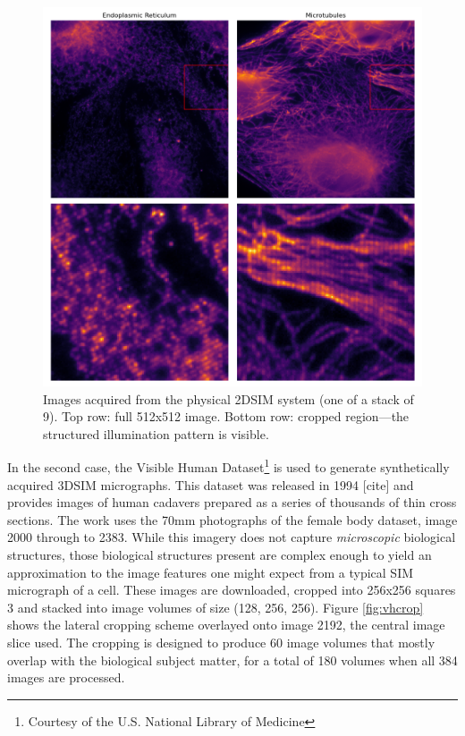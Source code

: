 \documentclass[12pt]{article}
\begin{document}
\begin{figure}[hbtp]
    \includegraphics[scale=0.53, center]{figures/2DSIM.png}
    \caption{Images acquired from the physical 2DSIM system (one of a stack of 9).
    Top row: full 512x512 image. Bottom row: cropped region---the structured illumination pattern is visible.}
    \label{fig:2DSIM}
\end{figure}

In the second case, the Visible Human Dataset\footnote{Courtesy of the U.S. National Library of Medicine} is used to generate synthetically acquired 3DSIM micrographs.
This dataset was released in 1994 [cite] and provides images of human cadavers prepared as a series of thousands of thin cross sections.
The work uses the 70mm photographs of the female body dataset, image 2000 through to 2383.
While this imagery does not capture \textit{microscopic} biological structures,
those biological structures present are complex enough to yield an approximation to the image features one might expect from a typical SIM micrograph of a cell.
These images are downloaded, cropped into 256x256 squares 3 and stacked into image volumes of size (128, 256, 256).
Figure \ref{fig:vhcrop} shows the lateral cropping scheme overlayed onto image 2192,
the central image slice used.
The cropping is designed to produce 60 image volumes that mostly overlap with the biological subject matter,
for a total of 180 volumes when all 384 images are processed.
\end{document}
